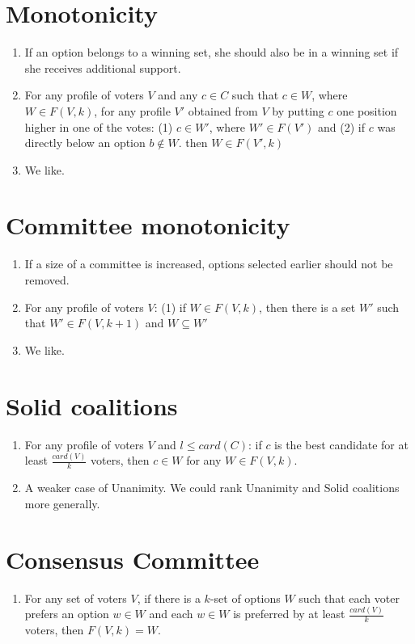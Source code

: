 \documentclass{article}
\begin{document}
\section{Monotonicity}
\begin{enumerate}
\item If an option belongs to a winning set, she should also be in a winning set if she receives additional support.
\item For any profile of voters $V$ and any $c \in C$ such that $c \in W$, where $W \in F(V, k)$, for any profile $V'$ obtained from $V$ by putting $c$ one position higher in one of the votes: (1) $c \in W'$, where $W' \in F(V')$ and (2) if $c$ was directly below an option $b \notin W$. then $W \in F(V', k)$
\item We like.
\end{enumerate}

\section{Committee monotonicity}
\begin{enumerate}
\item If a size of a committee is increased, options selected earlier should not be removed.
\item For any profile of voters $V$: (1) if $W \in F(V, k)$, then there is a set $W'$ such that $W' \in F(V, k+1)$ and $W \subseteq W'$
\item We like.
\end{enumerate}

\section{Solid coalitions}
\begin{enumerate}
\item For any profile of voters $V$ and $l \leq card(C)$: if $c$ is the best candidate for at least $\frac{card(V)}{k}$ voters, then $c \in W$ for any $W \in F(V, k)$.
\item A weaker case of Unanimity. We could rank Unanimity and Solid coalitions more generally.
\end{enumerate}

\section{Consensus Committee}
\begin{enumerate}
\item For any set of voters $V$, if there is a $k$-set of options $W$ such that each voter prefers an option $w \in W$ and each $w \in W$ is preferred by at least $\frac{card(V)}{k}$ voters, then $F(V, k) = W$.
\end{enumerate}
\end{document}
